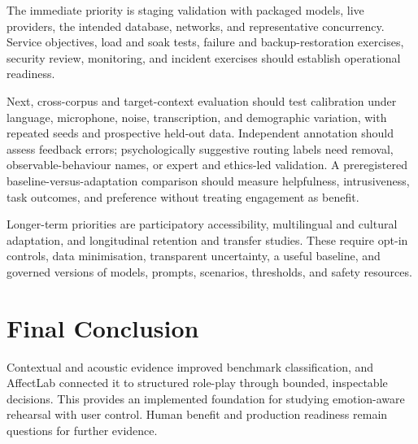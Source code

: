 The immediate priority is staging validation with packaged models, live providers, the intended database, networks, and representative concurrency. Service objectives, load and soak tests, failure and backup-restoration exercises, security review, monitoring, and incident exercises should establish operational readiness.

Next, cross-corpus and target-context evaluation should test calibration under language, microphone, noise, transcription, and demographic variation, with repeated seeds and prospective held-out data. Independent annotation should assess feedback errors; psychologically suggestive routing labels need removal, observable-behaviour names, or expert and ethics-led validation. A preregistered baseline-versus-adaptation comparison should measure helpfulness, intrusiveness, task outcomes, and preference without treating engagement as benefit.

Longer-term priorities are participatory accessibility, multilingual and cultural adaptation, and longitudinal retention and transfer studies. These require opt-in controls, data minimisation, transparent uncertainty, a useful baseline, and governed versions of models, prompts, scenarios, thresholds, and safety resources.

\section{Final Conclusion}
\label{sec:final-conclusion}

Contextual and acoustic evidence improved benchmark classification, and AffectLab connected it to structured role-play through bounded, inspectable decisions. This provides an implemented foundation for studying emotion-aware rehearsal with user control. Human benefit and production readiness remain questions for further evidence.

